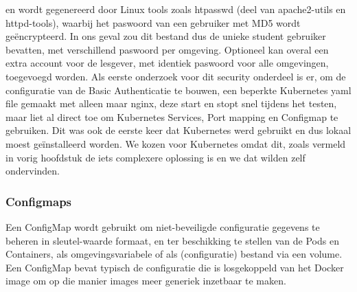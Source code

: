 en wordt gegenereerd door Linux tools zoals htpasswd (deel van apache2-utils en httpd-tools), waarbij het paswoord van een gebruiker met MD5 wordt geëncrypteerd. In ons geval zou dit bestand dus de unieke student gebruiker bevatten, met verschillend paswoord per omgeving.
Optioneel kan overal een extra account voor de lesgever, met identiek paswoord voor alle omgevingen, toegevoegd worden.
\newline
\newline
Als eerste onderzoek voor dit security onderdeel is er, om de configuratie van de Basic Authenticatie te bouwen, een beperkte Kubernetes yaml file gemaakt met alleen maar nginx, deze start en stopt snel tijdens het testen, maar liet al direct toe om Kubernetes Services, Port mapping en Configmap te gebruiken. Dit was ook de eerste keer dat Kubernetes werd gebruikt en dus lokaal moest geïnstalleerd worden.
\newline
We kozen voor Kubernetes omdat dit, zoals vermeld in vorig hoofdstuk de iets complexere oplossing is en we dat wilden zelf ondervinden.
\newline
\newline
\subsubsection{Configmaps} 
\autocite{Kubernetes2023}
\newline
Een ConfigMap wordt gebruikt om niet-beveiligde configuratie gegevens te beheren in sleutel-waarde formaat, en ter beschikking te stellen van de Pods en Containers, als omgevingsvariabele of als (configuratie) bestand via een volume.
Een ConfigMap bevat typisch de configuratie die is losgekoppeld van het Docker image om op die manier images meer generiek inzetbaar te maken.\textcite{Kubernetes2023}


